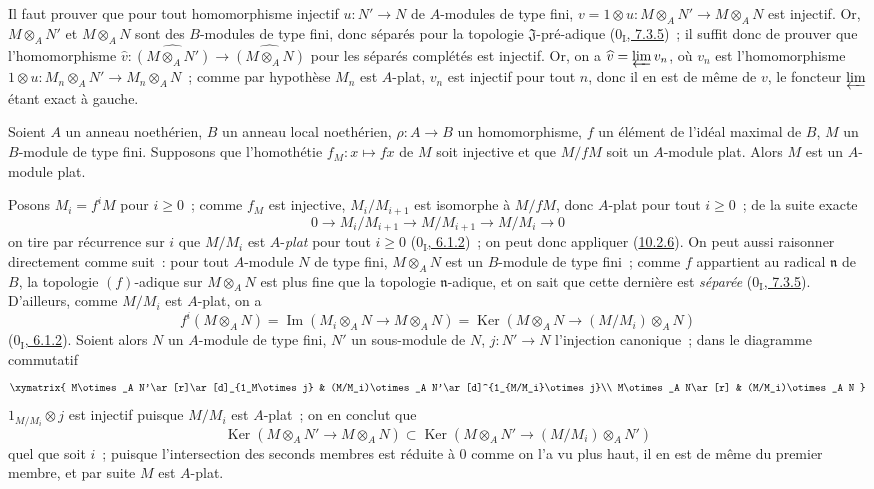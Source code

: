 Il faut prouver que pour tout homomorphisme injectif $u:N'\to N$ de
$A$-modules de type fini, $v=1\otimes u:M\otimes_A N'\to M\otimes_A N$ est
injectif. Or, $M\otimes_A N'$ et $M\otimes_A N$ sont des $B$-modules de type
fini, donc séparés pour la topologie $\mathfrak{J}$-pré-adique
(\hyperref[0.7.3.5-fr]{$0_{\mathrm I}$, 7.3.5})~; il suffit donc de prouver que
l'homomorphisme
$\widehat v:\widehat{(M\otimes_A N')}\to\widehat{(M\otimes_A N)}$ pour les
séparés complétés est injectif. Or, on a $\widehat v=\varprojlim v_n$, où
$v_n$ est l'homomorphisme $1\otimes u:M_n\otimes_A N'\to M_n\otimes_A N$~;
comme par hypothèse $M_n$ est $A$-plat, $v_n$ est injectif pour tout $n$, donc
il en est de même de $v$, le foncteur $\varprojlim$ étant exact à gauche.

\begin{corollary}[10.2.7]
\label{0.10.2.7-fr}
Soient $A$ un anneau noethérien, $B$ un anneau local noethérien,
$\rho:A\to B$ un homomorphisme, $f$ un élément de l'idéal maximal de $B$, $M$
un $B$-module de type fini. Supposons que l'homothétie
$f_M:x\mapsto fx$ de $M$ soit injective et que $M/fM$ soit un $A$-module
plat. Alors $M$ est un $A$-module plat.
\end{corollary}

Posons $M_i=f^iM$ pour $i\geq0$~; comme $f_M$ est injective,
$M_i/M_{i+1}$ est isomorphe à $M/fM$, donc $A$-plat pour tout $i\geq0$~; de
la suite exacte
\[
  0\longrightarrow M_i/M_{i+1}\longrightarrow M/M_{i+1}
  \longrightarrow M/M_i\longrightarrow0
\]
on tire par récurrence sur $i$ que $M/M_i$ est $A$-\emph{plat} pour tout
$i\geq0$ (\hyperref[0.6.1.2-fr]{$0_{\mathrm I}$, 6.1.2})~; on peut donc
appliquer (\hyperref[0.10.2.6-fr]{10.2.6}). On peut aussi raisonner directement
comme suit~: pour tout $A$-module $N$ de type fini, $M\otimes_A N$ est un
$B$-module de type fini~; comme $f$ appartient au radical $\mathfrak n$ de
$B$, la topologie $(f)$-adique sur $M\otimes_A N$ est plus fine que la
topologie $\mathfrak n$-adique, et on sait que cette dernière est \emph{séparée}
(\hyperref[0.7.3.5-fr]{$0_{\mathrm I}$, 7.3.5}). D'ailleurs, comme $M/M_i$ est
$A$-plat, on a
\[
  f^i(M\otimes_A N)=\operatorname{Im}(M_i\otimes_A N\to M\otimes_A N)
  =\operatorname{Ker}(M\otimes_A N\to(M/M_i)\otimes_A N)
\]
(\hyperref[0.6.1.2-fr]{$0_{\mathrm I}$, 6.1.2}). Soient alors $N$ un
$A$-module de type fini, $N'$ un sous-module de $N$, $j:N'\to N$ l'injection
canonique~; dans le diagramme commutatif
\[
\xymatrix{
  M\otimes_A N'\ar[r]\ar[d]_{1_M\otimes j} &
  (M/M_i)\otimes_A N'\ar[d]^{1_{M/M_i}\otimes j}\\
  M\otimes_A N\ar[r] & (M/M_i)\otimes_A N
}
\]
$1_{M/M_i}\otimes j$ est injectif puisque $M/M_i$ est $A$-plat~; on en
conclut que
\[
  \operatorname{Ker}(M\otimes_A N'\to M\otimes_A N)
  \subset\operatorname{Ker}(M\otimes_A N'\to(M/M_i)\otimes_A N')
\]
quel que soit $i$~; puisque l'intersection des seconds membres est réduite à
$0$ comme on l'a vu plus haut, il en est de même du premier membre, et par
suite $M$ est $A$-plat.

